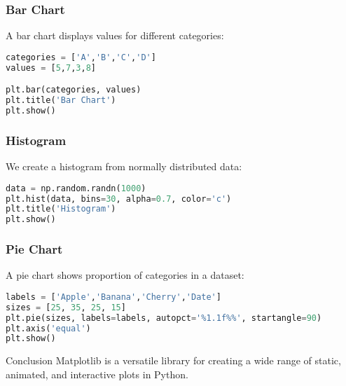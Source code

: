\begin{frame}[fragile]
\frametitle{Bar Chart}
A bar chart displays values for different categories:

\begin{lstlisting}[language=Python]
categories = ['A','B','C','D']
values = [5,7,3,8]

plt.bar(categories, values)
plt.title('Bar Chart')
plt.show()
\end{lstlisting}
\end{frame}


\begin{frame}[fragile]
\frametitle{Histogram}
We create a histogram from normally distributed data:

\begin{lstlisting}[language=Python]
data = np.random.randn(1000)
plt.hist(data, bins=30, alpha=0.7, color='c')
plt.title('Histogram')
plt.show()
\end{lstlisting}
\end{frame}


\begin{frame}[fragile]
\frametitle{Pie Chart}
A pie chart shows proportion of categories in a dataset:

\begin{lstlisting}[language=Python]
labels = ['Apple','Banana','Cherry','Date']
sizes = [25, 35, 25, 15]
plt.pie(sizes, labels=labels, autopct='%1.1f%%', startangle=90)
plt.axis('equal')
plt.show()
\end{lstlisting}

\end{frame}

\begin{frame}{Conclusion}
Matplotlib is a versatile library for creating a wide range of static, animated, and interactive plots in Python.
\end{frame}

